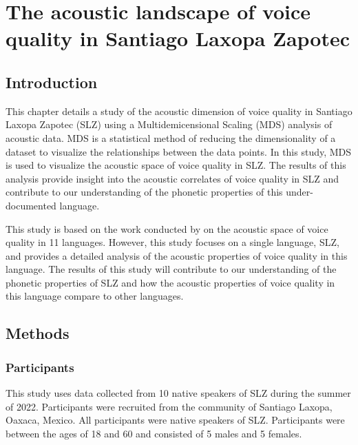 \chapter{The acoustic landscape of voice quality in Santiago Laxopa Zapotec} \label{ch:acousticlandscape}

\section{Introduction} \label{sec:acousticlandscape:intro}

This chapter details a study of the acoustic dimension of voice quality in Santiago Laxopa Zapotec (SLZ) using a Multidemicensional Scaling (MDS) analysis of acoustic data. MDS is a statistical method of reducing the dimensionality of a dataset to visualize the relationships between the data points. In this study, MDS is used to visualize the acoustic space of voice quality in SLZ. The results of this analysis provide insight into the acoustic correlates of voice quality in SLZ and contribute to our understanding of the phonetic properties of this under-documented language.

This study is based on the work conducted by \citet{keatingCrosslanguageAcousticSpace2023} on the acoustic space of voice quality in 11 languages. However, this study focuses on a single language, SLZ, and provides a detailed analysis of the acoustic properties of voice quality in this language. The results of this study will contribute to our understanding of the phonetic properties of SLZ and  how the acoustic properties of voice quality in this language compare to other languages.

\section{Methods} \label{sec:acousticlandscape:methods}
\subsection{Participants} \label{sec:acousticlandscape:participants}

This study uses data collected from 10 native speakers of SLZ during the summer of 2022. Participants were recruited from the community of Santiago Laxopa, Oaxaca, Mexico. All participants were native speakers of SLZ. Participants were between the ages of 18 and 60 and consisted of 5 males and 5 females.
